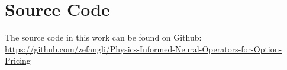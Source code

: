 \documentclass[a4paper,fleqn]{cas-sc}
\begin{document}





\section*{Source Code}
The source code in this work can be found on Github: \\
\url{https://github.com/zefangli/Physics-Informed-Neural-Operators-for-Option-Pricing}
% 
% 


\end{document}
